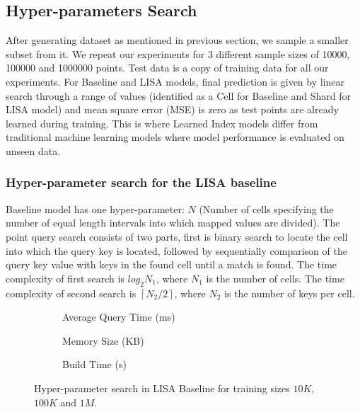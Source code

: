 \subsection{Hyper-parameters Search}

After generating dataset as mentioned in previous section, we sample a smaller subset from it. We repeat our experiments for $3$ different sample sizes of 10000, 100000 and 1000000 points. Test data is a copy of training data for all our experiments. For Baseline and LISA models, final prediction is given by linear search through a range of values (identified as a Cell for Baseline and Shard for LISA model) and mean square error (MSE) is zero as test points are already learned during training. This is where Learned Index models differ from traditional machine learning models where model performance is evaluated on unseen data. 

\subsubsection {Hyper-parameter search for the LISA baseline}
Baseline model has one hyper-parameter: $N$ (Number of cells specifying the number of equal length intervals into which mapped values are divided). The point query search consists of two parts, first is binary search to locate the cell into which the query key is located, followed by sequentially comparison of the query key value with keys in the found cell until a match is found. The time complexity of first search is $log_{2}N_{1}$, where $N_{1}$ is the number of cells. The time complexity of second search is  $ \left \lceil {N_{2} / 2}\right \rceil $, where $N_{2}$ is the number of keys per cell.  

\begin{figure}
 \centering
     \begin{subfigure}[b]{0.32\textwidth}
         \centering
         
         \caption{Average Query Time (ms)}
         \label{fig:2d_exp3_1_1}
     \end{subfigure}
     \hfill
     \begin{subfigure}[b]{0.32\textwidth}
         \centering
         
         \caption{Memory Size (KB)}
         \label{fig:2d_exp3_1_2}
     \end{subfigure}
     \hfill
     \begin{subfigure}[b]{0.32\textwidth}
         \centering
         
         \caption{Build Time (s)}
         \label{fig:2d_exp3_1_3}
     \end{subfigure}
     \hfill
     \caption{Hyper-parameter search in LISA Baseline for training sizes $10K$, $100K$ and $1M$.}
     \label{fig:LISA_Baseline_Hyperparameter_Search}
\end{figure}


